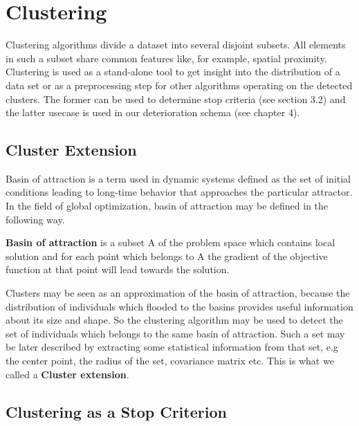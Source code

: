 
\chapter{Clustering}
\label{Clustering}

Clustering algorithms divide a dataset into several disjoint subsets. All elements in such
a subset share common features like, for example, spatial proximity.
Clustering is used as a stand-alone tool to get insight into the distribution
of a data set or as a preprocessing step for other algorithms operating on the
detected clusters. The former can be used to determine stop
criteria (see section 3.2) and the latter usecase is used in our deterioration
schema (see chapter 4).

\section{Cluster Extension}

Basin of attraction is a term used in dynamic systems
defined as the set of initial conditions leading to long-time 
behavior that approaches the particular attractor.
In the field of global optimization, basin of attraction may
be defined in the following way.

\begin{definition}\label{def:basin}
\textbf{Basin of attraction} is a subset A of the problem space which contains
local solution and for each point which belongs to A the gradient of the objective
function at that point will lead towards the solution.
\end{definition}

Clusters may be seen as an approximation of the basin of attraction, because
the distribution of individuals which flooded to the basins
provides useful information about its size and shape. So the clustering 
algorithm may be used to detect the set of individuals which belongs
to the same basin of attraction. Such a set may be later described by extracting
some statistical information from that set, e.g the center point,  
the radius of the set, covariance matrix etc. This is what we called
a \textbf{Cluster extension}.

\section{Clustering as a Stop Criterion}

